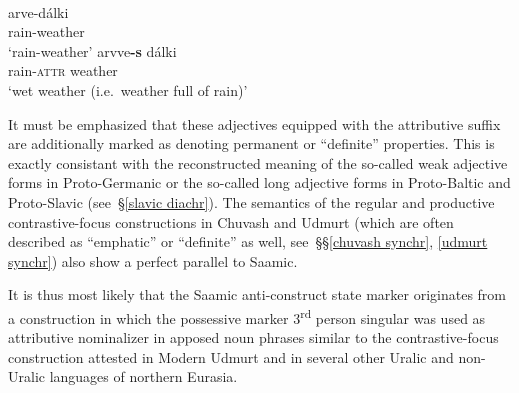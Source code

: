 {%
\begin{exe}
\ex
\begin{xlist}
\ex {}\\
\begin{xlist}
\ex
\gll	arve-dálki\\
	rain-weather\\
\glt	‘rain-weather’
\ex
\gll	arvve\textbf{-s} dálki\\
	rain-\textsc{attr} weather\\
\glt	‘wet weather (i.e.~weather full of rain)’
\end{xlist}
\end{xlist}
\end{exe}
It must be emphasized that these adjectives equipped with the attributive suffix are additionally marked as denoting permanent or “definite” properties. This is exactly consistant with the reconstructed meaning of the so-called weak adjective forms in Proto-Germanic or the so-called long adjective forms in Proto-Baltic and Proto-Slavic (see~\S\ref{slavic diachr}). The semantics of the regular and productive contrastive-focus constructions in Chuvash and Udmurt (which are often described as “emphatic” or “definite” as well, see~\S\S\ref{chuvash synchr}, \ref{udmurt synchr}) also show a perfect parallel to Saamic. 

It is thus most likely that the Saamic anti-construct state marker originates from a construction in which the possessive marker 3\textsuperscript{rd} person singular was used as attributive nominalizer in apposed noun phrases similar to the contrastive-focus construction attested in Modern Udmurt and in several other Uralic and non-Uralic languages of northern Eurasia.

}
